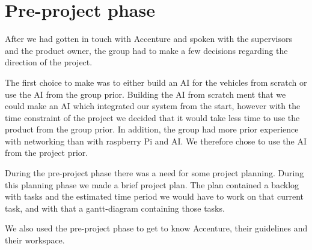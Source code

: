 \section{Pre-project phase}
After we had gotten in touch with Accenture and spoken with the supervisors and the product owner, the group had to make a few decisions regarding the direction of the project.

The first choice to make was to either build an AI for the vehicles from scratch or use the AI from the group prior. Building the AI from scratch ment that we could make an AI which integrated our system from the start, however with the time constraint of the project we decided that it would take less time to use the product from the group prior. In addition, the group had more prior experience with networking than with raspberry Pi and AI. We therefore chose to use the AI from the project prior. 

During the pre-project phase there was a need for some project planning. During this planning phase we made a brief project plan. The plan contained a backlog with tasks and the estimated time period we would have to work on that current task, and with that a gantt-diagram containing those tasks. 

We also used the pre-project phase to get to know Accenture, their guidelines and their workspace. 

